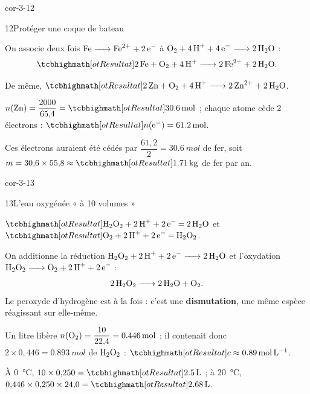 \begin{blocLivre}{cor-3-12}
\begin{corrige}{12}{Protéger une coque de bateau}
\begin{questions}
\item On associe deux fois $\ce{Fe -> Fe^{2+} + 2e-}$ à $\ce{O2 + 4H+ + 4e- -> 2H2O}$ :
\[\res{\ce{2Fe + O2 + 4H+ -> 2Fe^{2+} + 2H2O}}.\]
\item De même, $\res{\ce{2Zn + O2 + 4H+ -> 2Zn^{2+} + 2H2O}}$.
\item $n(\ce{Zn})=\dfrac{2000}{65{,}4}=\res{\qty{30,6}{mol}}$ ; chaque atome cède 2 électrons : $\res{n(\mathrm{e}^-)=\qty{61,2}{mol}}$.
\item Ces électrons auraient été cédés par $\dfrac{61{,}2}{2}=\qty{30,6}{mol}$ de fer, soit $m=30{,}6\times55{,}8\approx\res{\qty{1,71}{kg}}$ de
fer par an.
\end{questions}
\end{corrige}
\end{blocLivre}
\begin{blocLivre}{cor-3-13}
\begin{corrige}{13}{L'eau oxygénée « à 10 volumes »}
\begin{questions}
\item $\res{\ce{H2O2 + 2H+ + 2e- = 2H2O}}$ et $\res{\ce{O2 + 2H+ + 2e- = H2O2}}$.
\item On additionne la réduction $\ce{H2O2 + 2H+ + 2e- -> 2H2O}$ et l'oxydation $\ce{H2O2 -> O2 + 2H+ + 2e-}$ :
\[\ce{2H2O2 -> 2H2O + O2}.\]
Le peroxyde d'hydrogène est à la fois  : c'est une \textbf{dismutation}, une même espèce réagissant
sur elle-même.
\item Un litre libère $n(\ce{O2})=\dfrac{10}{22{,}4}=\qty{0,446}{mol}$ ; il contenait donc $2\times0{,}446=\qty{0,893}{mol}$ de $\ce{H2O2}$ :
$\res{c\approx\qty{0,89}{mol.L^{-1}}}$.
\item À \qty{0}{\degreeCelsius}, $10\times0{,}250=\res{\qty{2,5}{L}}$ ; à \qty{20}{\degreeCelsius}, $0{,}446\times0{,}250\times24{,}0=\res{\qty{2,68}{L}}$.
\end{questions}
\end{corrige}
\end{blocLivre}
